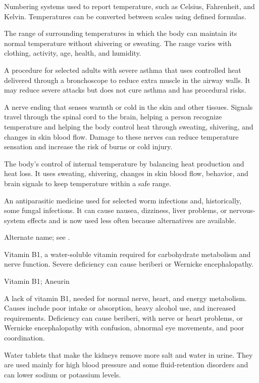  Numbering systems used to report temperature, such as Celsius, Fahrenheit, and Kelvin. Temperatures can be converted between scales using defined formulas.

 The range of surrounding temperatures in which the body can maintain its normal temperature without shivering or sweating. The range varies with clothing, activity, age, health, and humidity.

 A procedure for selected adults with severe asthma that uses controlled heat delivered through a bronchoscope to reduce extra muscle in the airway walls. It may reduce severe attacks but does not cure asthma and has procedural risks.

 A nerve ending that senses warmth or cold in the skin and other tissues. Signals travel through the spinal cord to the brain, helping a person recognize temperature and helping the body control heat through sweating, shivering, and changes in skin blood flow. Damage to these nerves can reduce temperature sensation and increase the risk of burns or cold injury.

 The body’s control of internal temperature by balancing heat production and heat loss. It uses sweating, shivering, changes in skin blood flow, behavior, and brain signals to keep temperature within a safe range.

 An antiparasitic medicine used for selected worm infections and, historically, some fungal infections. It can cause nausea, dizziness, liver problems, or nervous-system effects and is now used less often because alternatives are available.

 Alternate name; see .

 Vitamin B1, a water-soluble vitamin required for carbohydrate metabolism and nerve function. Severe deficiency
can cause beriberi or Wernicke encephalopathy.

\synonyms
Vitamin B1; Aneurin

 A lack of vitamin B1, needed for normal nerve, heart, and energy metabolism. Causes include poor intake or absorption, heavy alcohol use, and increased requirements. Deficiency can cause beriberi, with nerve or heart problems, or Wernicke encephalopathy with confusion, abnormal eye movements, and poor coordination.

 Water tablets that make the kidneys remove more salt and water in urine. They are used mainly for high blood pressure and some fluid-retention disorders and can lower sodium or potassium levels.

